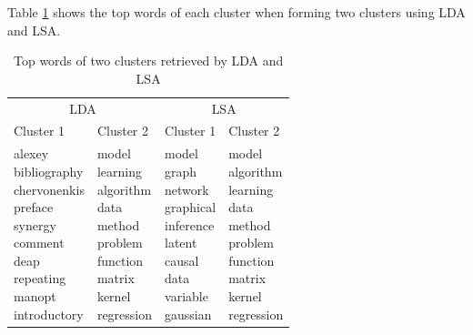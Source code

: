 Table \ref{tab:lda_lsa_topwords} shows the top words of each cluster when forming two clusters using LDA and LSA.
\begin{table}[]
    \centering
    \caption{Top words of two clusters retrieved by LDA and LSA}
    \begin{tabular}{l|l|l|l}
        \multicolumn{2}{c}{LDA} & \multicolumn{2}{c}{LSA} \\
        Cluster 1 & Cluster 2 & Cluster 1 & Cluster 2\\
        \hline
        \shortstack[l]{alexey \\ bibliography \\ chervonenkis \\ preface \\ synergy \\ comment \\ deap \\ repeating \\ manopt \\ introductory} & \shortstack[l]{model \\ learning \\ algorithm \\ data \\ method \\ problem \\ function \\ matrix \\ kernel \\ regression} & \shortstack[l]{model \\ graph \\ network \\ graphical \\ inference \\ latent \\ causal \\ data \\ variable \\ gaussian} & \shortstack[l]{model \\ algorithm \\ learning \\ data \\ method \\ problem \\ function \\ matrix \\ kernel \\ regression} 
    \end{tabular}
    \label{tab:lda_lsa_topwords}
\end{table}
